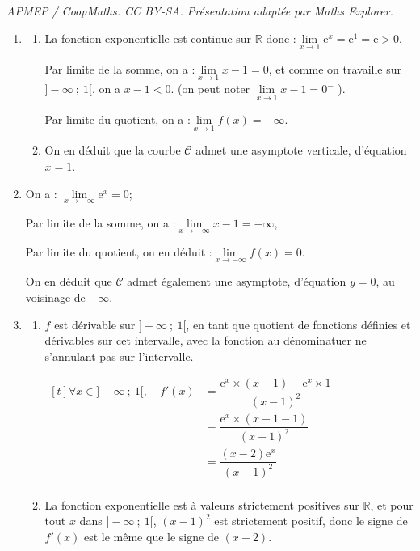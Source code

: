 \documentclass[10pt]{article}
\providecommand{\R}{\mathbb{R}}
\providecommand{\e}{{\mathrm{e}}}
\begin{document}
\noindent\textit{APMEP / CoopMaths. CC BY-SA. Présentation adaptée par Maths Explorer.}\par\medskip
\medskip

\begin{enumerate}
\item \begin{enumerate}
		\item La fonction exponentielle est continue sur $\R$ donc :\quad $\lim\limits_{x \to 1} \e^{x} = \e^1 = \e >0$.

		Par limite de la somme, on a :\quad $\lim\limits_{x \to 1} x - 1 = 0$, et comme on travaille sur $]-\infty~;~ 1[ $, on a $x - 1 < 0$. (on peut noter $\lim\limits_{x \to 1} x - 1 = 0^-$ ).

		Par limite du quotient, on a :\quad $\lim\limits_{x \to 1} f(x) = -\infty$.

		\item On en déduit que la courbe $ \mathcal{C} $ admet une asymptote verticale, d'équation $x = 1$.

	\end{enumerate}
	\item On a : \quad $\lim\limits_{x \to -\infty} \e^x = 0$;

	Par limite de la somme, on a :\quad $\lim\limits_{x \to -\infty} x - 1 =-\infty$,

	Par limite du quotient, on en déduit :\quad $\lim\limits_{x \to -\infty} f(x) = 0$.

	On en déduit que $ \mathcal{C} $ admet également une asymptote, d'équation $y = 0$, au voisinage de $ -\infty $.

\item \begin{enumerate}
		\item $f$ est dérivable sur $ ]-\infty ~;~ 1[ $, en tant que quotient de fonctions définies et dérivables sur cet intervalle, avec la fonction au dénominatuer ne s'annulant pas sur l'intervalle.

		$\begin{aligned}[t] \forall x \in ]-\infty~;~1[ ,\quad f'(x) & = \dfrac{\e^x \times (x - 1) - \e^x \times 1}{(x-1)^2 }\\
		&= \dfrac{\e^x \times (x - 1 - 1)}{(x-1)^2}\\
		&= \dfrac{(x - 2)\e^x}{(x - 1)^2}\\ \end{aligned}$

		\item La fonction exponentielle est à valeurs strictement positives sur $\R$, et pour tout $x$ dans $ ]-\infty ~;~ 1[ $, $(x - 1)^2$ est strictement positif, donc le signe de $f'(x)$ est le même que le signe de $(x - 2)$.


\end{enumerate}
\end{enumerate}
\end{document}
